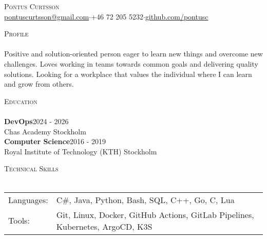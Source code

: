 \documentclass[a4paper]{article}
\newcommand{\lineunder} {
    \vspace*{-8pt} \\
    \hspace*{-18pt} \hrulefill \\
}
\newcommand{\header} [1] {
    {\hspace*{-18pt}\vspace*{6pt} \textsc{#1}}
    \vspace*{-6pt} \lineunder
}
\begin{document}
\vspace*{-40pt}

    

\vspace*{-10pt}

\begin{center}
	{\Huge \scshape {Pontus Curtsson}}\\
    \vspace{2mm}
	\href{mailto:pontuscurtsson@gmail.com}{pontuscurtsson@gmail.com}\hspace{3mm}$\cdot$\hspace{3mm}+46 72 205 5232\hspace{3mm}$\cdot$\hspace{3mm}\href{https://github.com/pontusc}{github.com/pontusc}\\
\end{center}
\vspace{2mm}

\header{Profile}
\vspace{4mm}
Positive and solution-oriented person eager to learn new things and overcome new challenges. Loves working in teams towards common goals and delivering quality solutions. 
\newline
\newline
Looking for a workplace that values the individual where I can learn and grow from others.
\vspace{8mm}

\header{Education}
\vspace{4mm}
\textbf{DevOps}\hfill 2024 - 2026\\
Chas Academy \hfill Stockholm\\
\vspace{4mm}
\textbf{Computer Science}\hfill 2016 - 2019\\
Royal Institute of Technology (KTH) \hfill Stockholm\\
\vspace{8mm}


\header{Technical Skills}
\vspace{4mm}
\begin{tabular}{ l l }
	Languages: & C\#, Java, Python, Bash, SQL, C++, Go, C, Lua\\[1mm]
	Tools:     & Git, Linux, Docker, GitHub Actions, GitLab Pipelines, Kubernetes, ArgoCD, K3S\\
\end{tabular}
\vspace{8mm}
\end{document}
